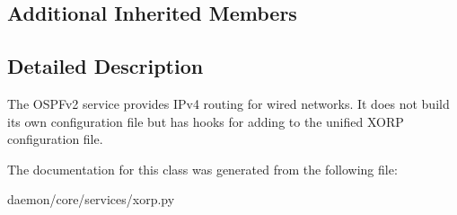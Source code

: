 \subsection*{Additional Inherited Members}


\subsection{Detailed Description}
\begin{DoxyVerb}The OSPFv2 service provides IPv4 routing for wired networks. It does
    not build its own configuration file but has hooks for adding to the
    unified XORP configuration file.
\end{DoxyVerb}
 

The documentation for this class was generated from the following file\+:\begin{DoxyCompactItemize}
\item 
daemon/core/services/xorp.\+py\end{DoxyCompactItemize}
